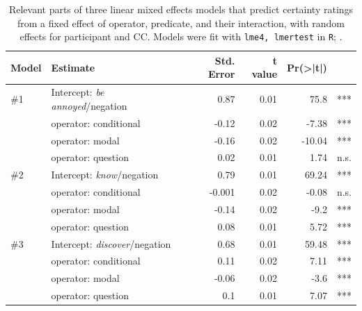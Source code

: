 \documentclass[12pt, a4paper]{article}
\begin{document}
\begin{table}[h]
\centering
\begin{tabular}{llrrrr}
Model & Estimate & Std. Error & t value & Pr(>|t|)\\
\midrule
\#1 & Intercept: \emph{be annoyed}/negation & 0.87 & 0.01  & 75.8 & *** \\
& operator: conditional & -0.12 & 0.02  & -7.38 & *** \\
& operator: modal & -0.16 & 0.02  & -10.04 & *** \\
& operator: question & 0.02 & 0.01  & 1.74 & n.s. \\
\midrule
\#2 & Intercept: \emph{know}/negation & 0.79 & 0.01 &  69.24 & *** \\
&		operator: conditional & -0.001 & 0.02  & -0.08 & n.s. \\
&		operator: modal  & -0.14 & 0.02  & -9.2 & *** \\
&		operator: question & 0.08 & 0.01  & 5.72 & *** \\
\midrule
\#3 & Intercept: \emph{discover}/negation & 0.68 & 0.01  & 59.48 & *** \\
& operator: conditional & 0.11 & 0.02  & 7.11 & *** \\
&		operator: modal & -0.06 & 0.02  & -3.6 & *** \\
&		operator: question & 0.1 & 0.01  & 7.07 & *** \\

\bottomrule
\end{tabular}
\caption{\small Relevant parts of three linear mixed effects models that predict certainty ratings from a fixed effect of operator, predicate, and their interaction, with random effects for participant and CC. Models were fit with \texttt{lme4, lmertest} in \texttt{R}; \citealp{bates_fitting_2015,kuznetsova_lmertest_2016,r_core_team_r_2014}.}\label{t:models}
\end{table}

\newpage
\end{document}
